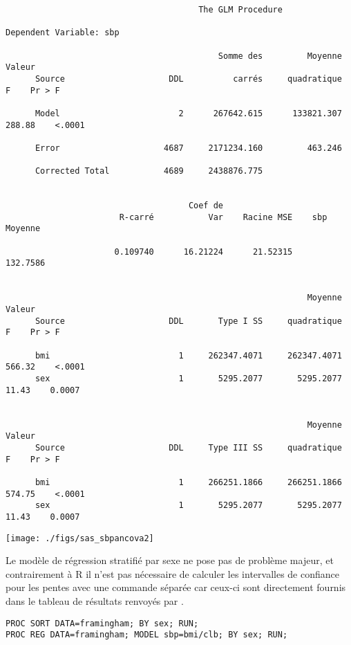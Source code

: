 \begin{verbatim}
                                       The GLM Procedure

Dependent Variable: sbp

                                           Somme des         Moyenne     Valeur
      Source                     DDL          carrés     quadratique          F    Pr > F

      Model                        2      267642.615      133821.307     288.88    <.0001

      Error                     4687     2171234.160         463.246

      Corrected Total           4689     2438876.775


                                     Coef de
                       R-carré           Var    Racine MSE    sbp Moyenne

                      0.109740      16.21224      21.52315       132.7586


                                                             Moyenne     Valeur
      Source                     DDL       Type I SS     quadratique          F    Pr > F

      bmi                          1     262347.4071     262347.4071     566.32    <.0001
      sex                          1       5295.2077       5295.2077      11.43    0.0007


                                                             Moyenne     Valeur
      Source                     DDL     Type III SS     quadratique          F    Pr > F

      bmi                          1     266251.1866     266251.1866     574.75    <.0001
      sex                          1       5295.2077       5295.2077      11.43    0.0007
\end{verbatim}

\texttt{[image: ./figs/sas\_sbpancova2]}

Le modèle de régression stratifié par sexe ne pose pas de problème majeur,
et contrairement à R il n'est pas nécessaire de calculer les intervalles de
confiance pour les pentes avec une commande séparée car ceux-ci sont
directement fournis dans le tableau de résultats renvoyés par \SAS.
\begin{verbatim}
PROC SORT DATA=framingham; BY sex; RUN;
PROC REG DATA=framingham; MODEL sbp=bmi/clb; BY sex; RUN;
\end{verbatim}

